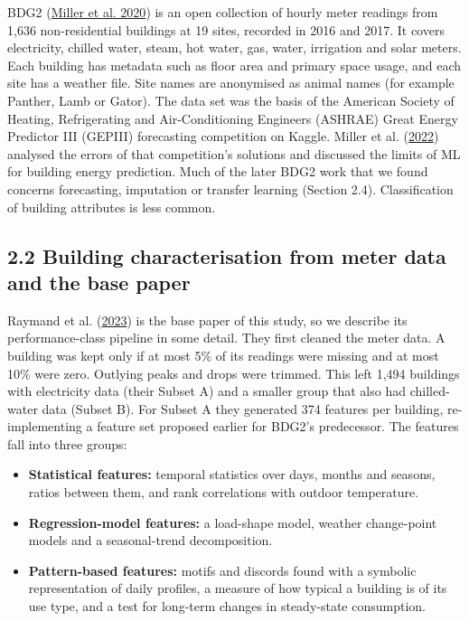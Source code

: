 \documentclass[
  10pt,
]{article}
\providecommand{\tightlist}{%
  \setlength{\itemsep}{0pt}\setlength{\parskip}{0pt}}
\begin{document}
BDG2 (\protect\hyperlink{ref-miller2020}{Miller et al. 2020}) is an open
collection of hourly meter readings from 1,636 non-residential buildings
at 19 sites, recorded in 2016 and 2017. It covers electricity, chilled
water, steam, hot water, gas, water, irrigation and solar meters. Each
building has metadata such as floor area and primary space usage, and
each site has a weather file. Site names are anonymised as animal names
(for example Panther, Lamb or Gator). The data set was the basis of the
American Society of Heating, Refrigerating and Air-Conditioning
Engineers (ASHRAE) Great Energy Predictor III (GEPIII) forecasting
competition on Kaggle. Miller et al.
(\protect\hyperlink{ref-miller2022}{2022}) analysed the errors of that
competition's solutions and discussed the limits of ML for building
energy prediction. Much of the later BDG2 work that we found concerns
forecasting, imputation or transfer learning (Section 2.4).
Classification of building attributes is less common.

\hypertarget{building-characterisation-from-meter-data-and-the-base-paper}{%
\subsection{2.2 Building characterisation from meter data and the base
paper}\label{building-characterisation-from-meter-data-and-the-base-paper}}

Raymand et al. (\protect\hyperlink{ref-raymand2023}{2023}) is the base
paper of this study, so we describe its performance-class pipeline in
some detail. They first cleaned the meter data. A building was kept only
if at most 5\% of its readings were missing and at most 10\% were zero.
Outlying peaks and drops were trimmed. This left 1,494 buildings with
electricity data (their Subset A) and a smaller group that also had
chilled-water data (Subset B). For Subset A they generated 374 features
per building, re-implementing a feature set proposed earlier for BDG2's
predecessor. The features fall into three groups:

\begin{itemize}
\tightlist
\item
  \textbf{Statistical features:} temporal statistics over days, months
  and seasons, ratios between them, and rank correlations with outdoor
  temperature.
\item
  \textbf{Regression-model features:} a load-shape model, weather
  change-point models and a seasonal-trend decomposition.
\item
  \textbf{Pattern-based features:} motifs and discords found with a
  symbolic representation of daily profiles, a measure of how typical a
  building is of its use type, and a test for long-term changes in
  steady-state consumption.
\end{itemize}
\end{document}
